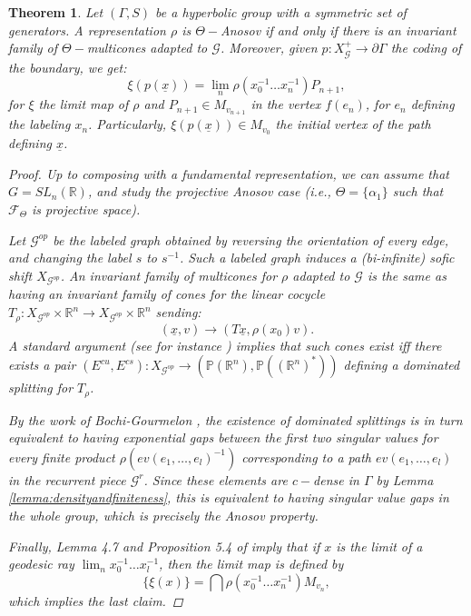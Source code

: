 \documentclass{amsart}
\newtheorem{thm}{Theorem}[section]
\theoremstyle{remark}
\theoremstyle{definition}
\begin{document}
\begin{thm}
   \label{thm:coding}
 Let $(\Gamma, S)$ be a hyperbolic group with a symmetric set of generators.
 A representation $\rho$ is $\Theta-$Anosov if and only if there is an invariant family of $\Theta-$multicones adapted to $\mathcal{G}$.
 Moreover, given $p : X_\mathcal{G}^+ \rightarrow \partial \Gamma$ the coding of the boundary, we get:
   $$\xi (p(\underline{x})) = \lim_n \rho (x_0^{-1}\ldots x_n^{-1}) P_{n+1},$$
 for $\xi$ the limit map of $\rho$ and $P_{n+1} \in M_{v_{n+1}}$ in the vertex $f(e_n)$, for $e_n$ defining the labeling $x_n$.
 Particularly, $\xi (p (\underline{x})) \in M_{v_0}$ the initial vertex of the path defining $\underline{x}$.
\begin{proof}
 Up to composing with a fundamental representation, we can assume that $G = SL_n (\mathbb{R})$, and study the projective Anosov case (i.e., $\Theta = \{\alpha_1\}$ such that $\mathcal{F}_\Theta$ is projective space).
   
 Let $\mathcal{G}^{op}$ be the labeled graph obtained by reversing the orientation of every edge, and changing the label $s$ to $s^{-1}$.
 Such a labeled graph induces a (bi-infinite) sofic shift $X_{\mathcal{G}^{op}}$.
 An invariant family of multicones for $\rho$ adapted to $\mathcal{G}$ is the same as having an invariant family of cones for the linear cocycle $T_\rho: X_{\mathcal{G}^{op}} \times \mathbb{R}^n \rightarrow X_{\mathcal{G}^{op}} \times \mathbb{R}^n$ sending:
$$(\underline{x}, v)\to (T\underline{x}, \rho(x_0) v).$$
 A standard argument (see for instance \cite[Theorem 2.6]{crovisier2015introduction}) implies that such cones exist iff there exists a pair $(E^{cu}, E^{cs}): X_{\mathcal{G}^{op}} \rightarrow (\mathbb{P}(\mathbb{R}^n), \mathbb{P}((\mathbb{R}^n)^*))$ defining a dominated splitting for $T_\rho$.

 By the work of Bochi-Gourmelon \cite{bochi2009some}, the existence of dominated splittings is in turn equivalent to having exponential gaps between the first two singular values for every finite product $\rho (ev (e_1,\ldots,e_l)^{-1})$ corresponding to a path $ev (e_1,\ldots,e_l)$ in the recurrent piece $\mathcal{G}^r$.
 Since these elements are $c-$dense in $\Gamma$ by Lemma \ref{lemma:densityandfiniteness}, this is equivalent to having singular value gaps in the whole group, which is precisely the Anosov property.

 Finally, Lemma 4.7 and Proposition 5.4 of \cite{bochi2019anosov} imply that if $x$ is the limit of a geodesic ray $\lim_n x_0^{-1}\ldots x_l^{-1}$, then the limit map is defined by
 $$\{\xi (x) \} = \bigcap \rho(x_0^{-1}\ldots x_n^{-1})M_{v_n},$$
 which implies the last claim.
\end{proof}
\end{thm}
\end{document}
